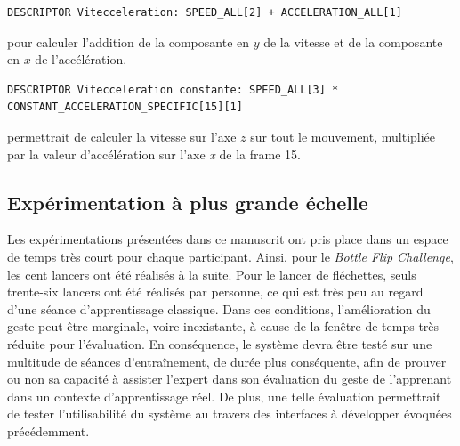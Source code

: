 \begin{framed}
\begin{lstlisting}[breaklines]
DESCRIPTOR Vitecceleration: SPEED_ALL[2] + ACCELERATION_ALL[1]
\end{lstlisting}
\end{framed}
pour calculer l'addition de la composante en $y$ de la vitesse et de la composante en $x$ de l'accélération.\\

\begin{framed}
\begin{lstlisting}[breaklines]
DESCRIPTOR Vitecceleration constante: SPEED_ALL[3] * CONSTANT_ACCELERATION_SPECIFIC[15][1]
\end{lstlisting}
\end{framed}
permettrait de calculer la vitesse sur l'axe $z$ sur tout le mouvement, multipliée par la valeur d'accélération sur l'axe \textit{x} de la frame 15.


\subsection{Expérimentation à plus grande échelle}
Les expérimentations présentées dans ce manuscrit ont pris place dans un espace de temps très court pour chaque participant. Ainsi, pour le \textit{Bottle Flip Challenge}, les cent lancers ont été réalisés à la suite. Pour le lancer de fléchettes, seuls trente-six lancers ont été réalisés par personne, ce qui est très peu au regard d'une séance d'apprentissage classique. Dans ces conditions, l'amélioration du geste peut être marginale, voire inexistante, à cause de la fenêtre de temps très réduite pour l'évaluation. En conséquence, le système devra être testé sur une multitude de séances d'entraînement, de durée plus conséquente, afin de prouver ou non sa capacité à assister l'expert dans son évaluation du geste de l'apprenant dans un contexte d'apprentissage réel. De plus, une telle évaluation permettrait de tester l'utilisabilité du système au travers des interfaces à développer évoquées précédemment.

